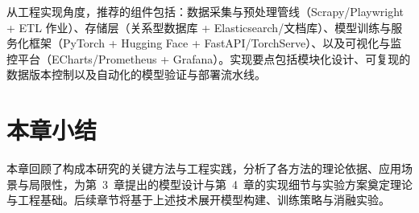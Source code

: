 从工程实现角度，推荐的组件包括：数据采集与预处理管线（Scrapy/Playwright + ETL 作业）、存储层（关系型数据库 + Elasticsearch/文档库）、模型训练与服务化框架（PyTorch + Hugging Face + FastAPI/TorchServe）、以及可视化与监控平台（ECharts/Prometheus + Grafana）。实现要点包括模块化设计、可复现的数据版本控制以及自动化的模型验证与部署流水线。

\section{本章小结}
\label{sec:chapter2_summary}

本章回顾了构成本研究的关键方法与工程实践，分析了各方法的理论依据、应用场景与局限性，为第~3~章提出的模型设计与第~4~章的实现细节与实验方案奠定理论与工程基础。后续章节将基于上述技术展开模型构建、训练策略与消融实验。
